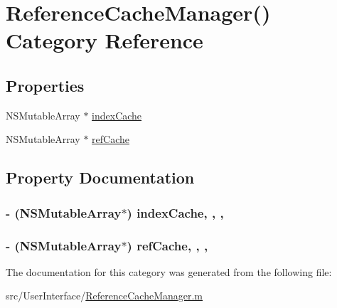 \hypertarget{category_reference_cache_manager_07_08}{\section{Reference\-Cache\-Manager() Category Reference}
\label{category_reference_cache_manager_07_08}
}
\subsection*{Properties}
\begin{DoxyCompactItemize}
\item 
N\-S\-Mutable\-Array $\ast$ \hyperlink{category_reference_cache_manager_07_08_aaec0cd743cb0ecc7e1c6699c494b8781}{index\-Cache}
\item 
N\-S\-Mutable\-Array $\ast$ \hyperlink{category_reference_cache_manager_07_08_a4e814c2d19262e5df73f96cd06b0ba76}{ref\-Cache}
\end{DoxyCompactItemize}


\subsection{Property Documentation}
\hypertarget{category_reference_cache_manager_07_08_aaec0cd743cb0ecc7e1c6699c494b8781}{
\subsubsection[{index\-Cache}]{\setlength{\rightskip}{0pt plus 5cm}-\/ (N\-S\-Mutable\-Array$\ast$) index\-Cache\hspace{0.3cm}{\ttfamily [read]}, {\ttfamily [write]}, {\ttfamily [atomic]}, {\ttfamily [retain]}}}\label{category_reference_cache_manager_07_08_aaec0cd743cb0ecc7e1c6699c494b8781}
\hypertarget{category_reference_cache_manager_07_08_a4e814c2d19262e5df73f96cd06b0ba76}{
\subsubsection[{ref\-Cache}]{\setlength{\rightskip}{0pt plus 5cm}-\/ (N\-S\-Mutable\-Array$\ast$) ref\-Cache\hspace{0.3cm}{\ttfamily [read]}, {\ttfamily [write]}, {\ttfamily [atomic]}, {\ttfamily [retain]}}}\label{category_reference_cache_manager_07_08_a4e814c2d19262e5df73f96cd06b0ba76}


The documentation for this category was generated from the following file\-:\begin{DoxyCompactItemize}
\item 
src/\-User\-Interface/\hyperlink{_reference_cache_manager_8m}{Reference\-Cache\-Manager.\-m}\end{DoxyCompactItemize}
